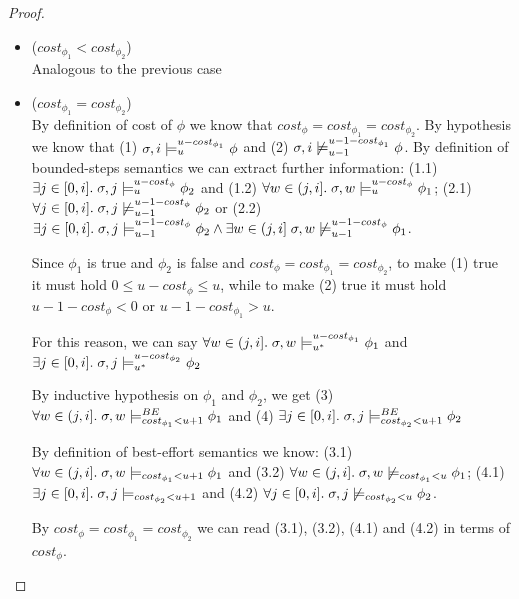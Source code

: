 \begin{theorem}
\begin{proof}
\begin{itemize}
\begin{itemize}
\begin{itemize}
            \item ($cost_{\phi_1} < cost_{\phi_2}$) \\
            Analogous to the previous case

            \item ($cost_{\phi_1} = cost_{\phi_2}$) \\
            By definition of cost of $\phi$ we know that $cost_\phi = cost_{\phi_1} = cost_{\phi_2}$.
            By hypothesis we know that 
            (1) $\sigma, i \models_{u}^{u-cost_{\phi_1}} \phi$ and 
            (2) $\sigma, i \not\models_{u-1}^{u-1-cost_{\phi_1}} \phi$.
            By definition of bounded-steps semantics we can extract further information:
            (1.1) $\exists j \in [0,i].\; \sigma,j \models_{u}^{u-cost_\phi} \phi_2$ and 
            (1.2) $\forall w \in (j,i].\; \sigma,w \models_{u}^{u-cost_\phi} \phi_1$;
            (2.1) $\forall j \in [0,i].\; \sigma,j \not\models_{u-1}^{u-1-cost_\phi} \phi_2$ or
            (2.2) $\exists j \in [0,i].\; \sigma,j \models_{u-1}^{u-1-cost_\phi} \phi_2 \land \exists w \in (j,i]\; \sigma,w \not\models_{u-1}^{u-1-cost_\phi} \phi_1$.

            Since $\phi_1$ is true and $\phi_2$ is false and $cost_\phi = cost_{\phi_1} = cost_{\phi_2}$, to make (1) true it must hold $0 \leq u-cost_\phi \leq u$, while to make (2) true it must hold $u-1-cost_\phi < 0$ or $u-1-cost_{\phi_1} > u$.
            
            For this reason, we can say $\forall w \in (j,i].\; \sigma,w \models_{{u}^*}^{u-cost_{\phi_1}} \phi_1$ and $\exists j \in [0,i].\; \sigma,j \models_{{u}^*}^{u-cost_{\phi_2}} \phi_2$
            
            By inductive hypothesis on $\phi_1$ and $\phi_2$, we get (3) $\forall w \in (j,i].\; \sigma,w \models_{cost_{\phi_1} < u + 1}^{BE} \phi_1$ and (4) $\exists j \in [0,i].\; \sigma,j \models_{cost_{\phi_2} < u + 1}^{BE} \phi_2$

            By definition of best-effort semantics we know: 
            (3.1) $\forall w \in (j,i].\; \sigma,w \models_{cost_{\phi_1} < u + 1} \phi_1$ and 
            (3.2) $\forall w \in (j,i].\; \sigma,w \not\models_{cost_{\phi_1} < u} \phi_1$;
            (4.1) $\exists j \in [0,i].\; \sigma,j \models_{cost_{\phi_2} < u + 1}$ and
            (4.2) $\forall j \in [0,i].\; \sigma,j \not\models_{cost_{\phi_2} < u} \phi_2$.

            By $cost_\phi = cost_{\phi_1} = cost_{\phi_2}$ we can read (3.1), (3.2), (4.1) and (4.2) in terms of $cost_\phi$.


\end{itemize}
\end{itemize}
\end{itemize}
\end{proof}
\end{theorem}
